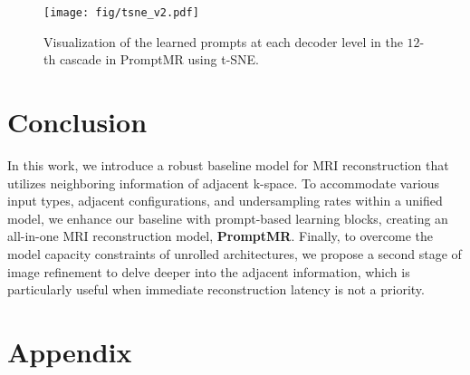 \documentclass[runningheads]{llncs}
\begin{document}
\begin{table}[t!]
    \centering
    \label{tab:abalation_all}
\end{table}

\begin{figure*}[t!]
\centering
\texttt{[image: fig/tsne\_v2.pdf]}
\caption{Visualization of the learned prompts at each decoder level in the $12$-th cascade in PromptMR using t-SNE.}
\label{fig:tsne}
\end{figure*}
 




\section{Conclusion}

In this work, we introduce a robust baseline model for MRI reconstruction that utilizes neighboring information of adjacent k-space. To accommodate various input types, adjacent configurations, and undersampling rates within a unified model, we enhance our baseline with prompt-based learning blocks, creating an all-in-one MRI reconstruction model, \textbf{PromptMR}. Finally, to overcome the model capacity constraints of unrolled architectures, we propose a second stage of image refinement to delve deeper into the adjacent information, which is particularly useful when immediate reconstruction latency is not a priority.
 
\FloatBarrier




\newpage
\appendix
\section*{Appendix}
\end{document}
